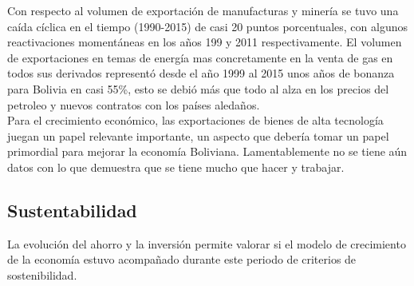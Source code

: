     Con respecto al volumen de exportación de manufacturas y minería se tuvo una caída cíclica en el tiempo (1990-2015) de casi 20 puntos porcentuales, con algunos reactivaciones momentáneas en los años 199 y 2011 respectivamente. El volumen de exportaciones en temas de energía mas concretamente en la venta de gas en todos sus derivados representó desde el año 1999 al 2015 unos años de bonanza para Bolivia en casi 55\%, esto se debió más que todo al alza en los precios del petroleo y nuevos contratos con los países aledaños.\\
    Para el crecimiento económico, las exportaciones de bienes de alta tecnología juegan un papel relevante importante, un aspecto que debería tomar un papel primordial para mejorar la economía Boliviana. Lamentablemente no se tiene aún datos con lo que demuestra que se tiene mucho que hacer y trabajar.

    \subsection{Sustentabilidad}
    La evolución del ahorro y la inversión permite valorar si el modelo de crecimiento de la economía estuvo acompañado durante este periodo de criterios de sostenibilidad. 

